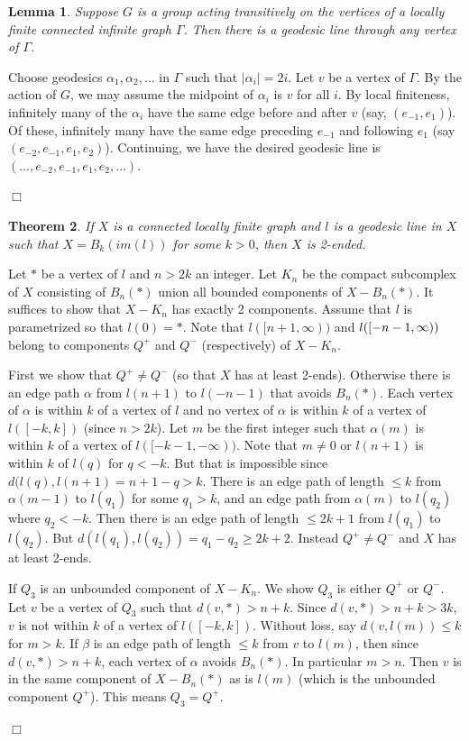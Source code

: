 \documentclass[12pt]{article}
\newtheorem{theorem}{Theorem}[subsection]
\newtheorem{lemma}[theorem]{Lemma}
\newenvironment{proof}{\addvspace{12pt}\noindent{\bf Proof:}}{
$\Box$\par\addvspace{12pt}}
\begin{document}
\begin{lemma}\label{geodesicline} 
Suppose $G$ is a group acting transitively on the vertices of a locally finite connected infinite graph $\Gamma$. Then there is a geodesic line through any vertex of $\Gamma$.
\end{lemma}
\begin{proof} Choose geodesics $\alpha_1,\alpha_2,\ldots$ in $\Gamma$ such that $|\alpha_i|=2i$. Let $v$ be a vertex of $\Gamma$. By the action of $G$, we may assume the midpoint of $\alpha_i$ is $v$ for all $i$. By local finiteness, infinitely many of the $\alpha_i$ have the same edge before and after $v$ (say, $(e_{-1},e_1)$). Of these, infinitely many have the same edge preceding $e_{-1}$ and following $e_1$ (say $(e_{-2},e_{-1}, e_1,e_2)$). Continuing, we have the desired geodesic line is $(\ldots, e_{-2}, e_{-1}, e_1,e_2, \ldots)$. 
\end{proof}

\begin{theorem} \label{line=2} 
If $X$ is a connected locally finite graph and $l$ is a geodesic line in $X$ such that $X=B_k(im(l))$ for some $k>0$, then $X$ is 2-ended. 
\end{theorem}
\begin{proof} 
Let $\ast$ be a vertex of $l$ and $n>2k$ an integer. Let $K_n$ be the compact subcomplex of $X$ consisting of $B_{n}(\ast)$ union all bounded components of $X-B_n(\ast)$. It suffices to show that $X-K_n$ has exactly 2 components. Assume that $l$ is parametrized so that $l(0)=\ast$. Note that $l([n+1, \infty))$ and $l([-n-1,\-\infty))$ belong to components $Q^+$ and $Q^-$ (respectively) of $X-K_n$. 

First we show that $Q^+\ne Q^-$ (so that $X$ has at least 2-ends). Otherwise there is an edge path $\alpha$ from $l(n+1)$ to $l(-n-1)$ that avoids $B_n(\ast)$. Each vertex of $\alpha$ is within $k$ of a vertex of $l$ and no vertex of $\alpha$ is within $k$ of a vertex of $l([-k,k])$ (since $n>2k$). Let $m$ be the first integer such that $\alpha(m)$ is within $k$ of a vertex of $l([-k-1,-\infty))$. Note that $m\ne 0$ or $l(n+1)$ is within $k$ of $l(q)$ for $q<-k$. But that is impossible since $d(l(q), l(n+1)=n+1-q>k$. There is an edge path of length $\leq k$ from $\alpha(m-1)$ to $l(q_1)$ for some $q_1>k$, and an edge path from $\alpha(m)$ to $l(q_2)$ where $q_2<-k$. Then there is an edge path of length $\leq 2k+1$ from $l(q_1)$ to $l(q_2)$. But $d(l(q_1), l(q_2))=q_1-q_2\geq 2k+2$. Instead $Q^+\ne Q^-$ and $X$ has at least 2-ends. 

If $Q_3$ is an unbounded component of $X-K_n$. We show $Q_3$ is either $Q^+$ or $Q^-$. Let $v$ be a vertex of $Q_3$ such that $d(v,\ast)>n+k$. Since $d(v,\ast)> n+k>3k$, $v$ is not within $k$ of a vertex of $l([-k,k])$. Without loss, say $d(v,l(m))\leq k$ for $m>k$. If $\beta$ is an edge path of length $\leq k$ from $v$ to $l(m)$, then since $d(v,\ast)>n+k$, each vertex of $\alpha$ avoids $B_n(\ast)$. In particular $m>n$. Then $v$ is in the same component of $X-B_n(\ast)$ as is $l(m)$ (which is the unbounded component $Q^+$).  This means $Q_3=Q^+$. 
\end{proof} 
\end{document}
